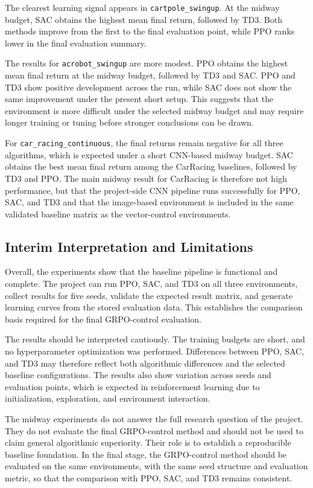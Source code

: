 The clearest learning signal appears in \texttt{cartpole\_swingup}. At the midway budget, SAC obtains the highest mean final return, followed by TD3. Both methods improve from the first to the final evaluation point, while PPO ranks lower in the final evaluation summary.

The results for \texttt{acrobot\_swingup} are more modest. PPO obtains the highest mean final return at the midway budget, followed by TD3 and SAC. PPO and TD3 show positive development across the run, while SAC does not show the same improvement under the present short setup. This suggests that the environment is more difficult under the selected midway budget and may require longer training or tuning before stronger conclusions can be drawn.

For \texttt{car\_racing\_continuous}, the final returns remain negative for all three algorithms, which is expected under a short CNN-based midway budget. SAC obtains the best mean final return among the CarRacing baselines, followed by TD3 and PPO. The main midway result for CarRacing is therefore not high performance, but that the project-side CNN pipeline runs successfully for PPO, SAC, and TD3 and that the image-based environment is included in the same validated baseline matrix as the vector-control environments.

\subsection{Interim Interpretation and Limitations}
\label{sec:experiments-interpretation}

Overall, the experiments show that the baseline pipeline is functional and complete. The project can run PPO, SAC, and TD3 on all three environments, collect results for five seeds, validate the expected result matrix, and generate learning curves from the stored evaluation data. This establishes the comparison basis required for the final GRPO-control evaluation.

The results should be interpreted cautiously. The training budgets are short, and no hyperparameter optimization was performed. Differences between PPO, SAC, and TD3 may therefore reflect both algorithmic differences and the selected baseline configurations. The results also show variation across seeds and evaluation points, which is expected in reinforcement learning due to initialization, exploration, and environment interaction.

The midway experiments do not answer the full research question of the project. They do not evaluate the final GRPO-control method and should not be used to claim general algorithmic superiority. Their role is to establish a reproducible baseline foundation. In the final stage, the GRPO-control method should be evaluated on the same environments, with the same seed structure and evaluation metric, so that the comparison with PPO, SAC, and TD3 remains consistent.
